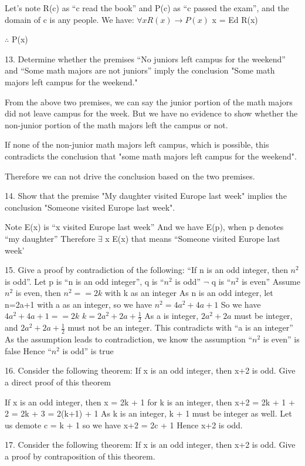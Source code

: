\documentclass{article}
\begin{document}
Let's note R(c) as ``c read the book'' and P(c) as ``c passed the exam'', and the domain of c is any people.
We have:
$\forall x R(x) \to P(x)$
x = Ed
R(x)

$\therefore$ P(x)

13. Determine whether the premises ``No juniors left campus for the weekend'' and ``Some math majors are not juniors'' imply the conclusion "Some math majors left campus for the weekend."

From the above two premises, we can say the junior portion of the math majors did not leave campus for the week. But we have no evidence to show whether the non-junior portion of the math majors left the campus or not.

If none of the non-junior math majors left campus, which is possible, this contradicts the conclusion that "some math majors left campus for the weekend". 

Therefore we can not drive the conclusion based on the two premises.

14. Show that the premise "My daughter visited Europe last week" implies the conclusion "Someone visited Europe last week".

Note E(x) is ``x visited Europe last week''
And we have E(p), when p denotes ``my daughter''
Therefore $\exists$ x E(x) that means ``Someone visited Europe last week'

15. Give a proof by contradiction of the following: ``If n is an odd integer, then $n^2$ is odd''.
Let p is ``n is an odd integer'', q is ``$n^2$ is odd''
$\lnot$ q is ``$n^2$ is even''
Assume $n^2$ is even, then $n^2 == 2k$ with k as an integer
As n is an odd integer, let n=2a+1 with a as an integer, so we have $n^2 = 4a^2 + 4a + 1$
So we have $4a^2 + 4a + 1 == 2k$
$k = 2a^2 + 2a + \frac{1}{2}$
As a is integer, $2a^2 + 2a$ must be integer, and $2a^2 + 2a + \frac{1}{2}$ must not be an integer.
This contradicts with ``a is an integer''
As the assumption leads to contradiction, we know the assumption ``$n^2$ is even'' is false
Hence ``$n^2$ is odd'' is true

16. Consider the following theorem: If x is an odd integer, then x+2 is odd. Give a direct proof of this theorem

If x is an odd integer, then x = 2k + 1 for k is an integer, then x+2 = 2k + 1 + 2 = 2k + 3 = 2(k+1) + 1
As k is an integer, k + 1 must be integer as well. Let us demote c = k + 1 so we have x+2 = 2c + 1
Hence x+2 is odd.

17. Consider the following theorem: If x is an odd integer, then x+2 is odd. Give a proof by contraposition of this theorem.
\end{document}
